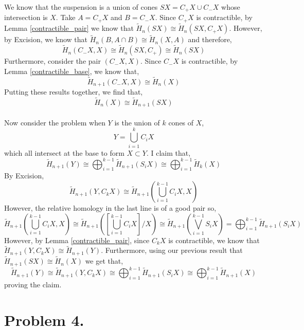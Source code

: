 \documentclass[12pt]{extarticle}
\begin{document}
We know that the suspension is a union of cones $SX = C_{+}X \cup C_{-} X$ whose intersection is $X$. Take $A = C_{+} X$ and $B = C_{-} X$. Since $C_{+} X$ is contractible, by Lemma \ref{contractible_pair} we know that $\tilde{H}_n(S X) \cong \tilde{H}_n(S X, C_{+} X)$. However, by Excision, we know that $\tilde{H}_n(B, A \cap B) \cong \tilde{H}_n(X, A)$ and therefore, 
\[\tilde{H}_n(C_{-} X, X) \cong \tilde{H}_n(S X, C_{+}) \cong \tilde{H}_n(S X)\]
Furthermore, consider the pair $(C_{-} X, X)$. Since $C_{-} X$ is contractible, by Lemma \ref{contractible_base}, we know that, \[\tilde{H}_{n+1}(C_{-} X, X) \cong \tilde{H}_{n}(X)\]
Putting these results together, we find that,
\[ \tilde{H}_n(X) \cong \tilde{H}_{n+1}(S X) \]
\bigskip\\
Now consider the problem when $Y$ is the union of $k$ cones of $X$, \[Y = \bigcup_{i = 1}^k C_{i} X\]
which all intersect at the base to form $X \subset Y$. I claim that,
\[ \tilde{H}_{n+1}(Y) \cong \bigoplus_{i = 1}^{k-1} \tilde{H}_{n+1}(S_i X) \cong \bigoplus_{i = 1}^{k-1} \tilde{H}_k(X) \]
By Excision,
\[ \tilde{H}_{n+1}(Y, C_k X) \cong \tilde{H}_{n+1}\left( \bigcup_{i = 1}^{k-1} C_i X, X \right) \]
However, the relative homology in the last line is of a good pair so,
\[ \tilde{H}_{n+1}\left( \bigcup_{i = 1}^{k-1} C_i X, X \right)  \cong \tilde{H}_{n+1}\left( \left[ \bigcup_{i = 1}^{k-1} C_i X \right] / X \right) \cong \tilde{H}_{n+1} \left( \bigvee_{i = 1}^{k - 1} S_i X \right) = \bigoplus_{i = 1}^{k - 1} \tilde{H}_{n+1}(S_i X) \]
However, by Lemma \ref{contractible_pair}, since $C_k X$ is contractible, we know that $\tilde{H}_{n+1}(Y, C_k X) \cong \tilde{H}_{n+1}(Y)$. Furthermore, using our previous result that $\tilde{H}_{n+1}(S X) \cong \tilde{H}_n(X)$ we get that,
\[ \tilde{H}_{n+1}(Y) \cong \tilde{H}_{n+1}(Y, C_k X) \cong \bigoplus_{i = 1}^{k - 1} \tilde{H}_{n+1}(S_i X) \cong \bigoplus_{i = 1}^{k - 1} \tilde{H}_{n+1}(X) \]
proving the claim.

\section*{Problem 4.}
\end{document}
